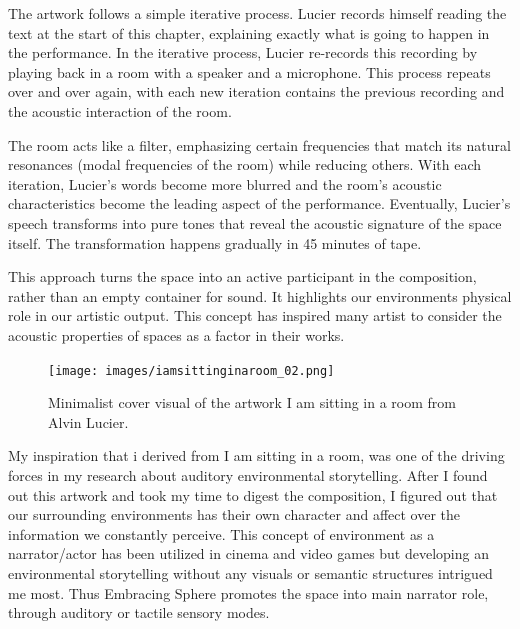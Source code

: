                 The artwork follows a simple iterative process. Lucier records himself reading the text at the start of this chapter, explaining exactly what is going to happen in the performance. In the iterative process, Lucier re-records this recording by playing back in a room with a speaker and a microphone. This process repeats over and over again, with each new iteration contains the previous recording and the acoustic interaction of the room\cite{Alvin_Lucier_I_am_Sitting_in_a_Room}.\par

                The room acts like a filter, emphasizing certain frequencies that match its natural resonances (modal frequencies of the room\cite{Room_Acoustics}) while reducing others. With each iteration, Lucier's words become more blurred and the room's acoustic characteristics become the leading aspect of the performance. Eventually, Lucier's speech transforms into pure tones that reveal the acoustic signature of the space itself. The transformation happens gradually in 45 minutes of tape\cite{MoMa_Lucier}.\par
                
                This approach turns the space into an active participant in the composition, rather than an empty container for sound. It highlights our environments physical role in our artistic output. This concept has inspired many artist to consider the acoustic properties of spaces as a factor in their works\cite{Lucier_phd}.\par

                \begin{figure}[H]
                    \centering
                    \texttt{[image: images/iamsittinginaroom\_02.png]}
                    \caption{Minimalist cover visual of the artwork I am sitting in a room from Alvin Lucier.}
                    \label{fig:IASIAR_02}
                \end{figure}

                My inspiration that i derived from I am sitting in a room, was one of the driving forces in my research about auditory environmental storytelling. After I found out this artwork and took my time to digest the composition, I figured out that our surrounding environments has their own character and affect over the information we constantly perceive. This concept of environment as a narrator/actor has been utilized in cinema and video games but developing an environmental storytelling without any visuals or semantic structures intrigued me most. Thus Embracing Sphere promotes the space into main narrator role, through auditory or tactile sensory modes.\par
                
